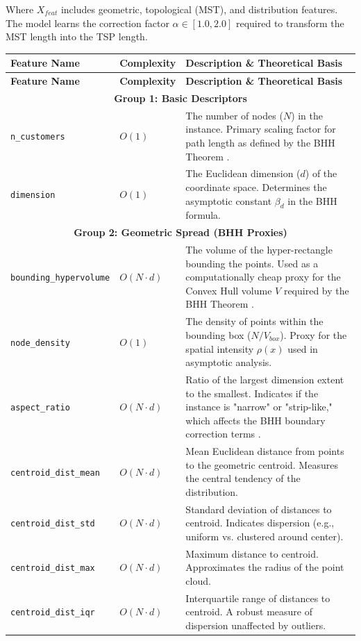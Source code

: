 \documentclass{article}
\begin{document}
\noindent Where $X_{feat}$ includes geometric, topological (MST), and distribution features. The model learns the correction factor $\alpha \in [1.0, 2.0]$ required to transform the MST length into the TSP length.
\begin{longtable}{p{4cm} p{2.5cm} p{8.5cm}}
\toprule
\textbf{Feature Name} & \textbf{Complexity} & \textbf{Description \& Theoretical Basis} \\
\midrule
\endfirsthead

\toprule
\textbf{Feature Name} & \textbf{Complexity} & \textbf{Description \& Theoretical Basis} \\
\midrule
\endhead

\multicolumn{3}{c}{\textbf{Group 1: Basic Descriptors}} \\
\midrule
\texttt{n\_customers} & $O(1)$ & The number of nodes ($N$) in the instance. Primary scaling factor for path length as defined by the BHH Theorem \cite{beardwood1959}. \\
\texttt{dimension} & $O(1)$ & The Euclidean dimension ($d$) of the coordinate space. Determines the asymptotic constant $\beta_d$ in the BHH formula. \\
\midrule

\multicolumn{3}{c}{\textbf{Group 2: Geometric Spread (BHH Proxies)}} \\
\midrule
\texttt{bounding\_hypervolume} & $O(N \cdot d)$ & The volume of the hyper-rectangle bounding the points. Used as a computationally cheap proxy for the Convex Hull volume $V$ required by the BHH Theorem \cite{beardwood1959}. \\
\texttt{node\_density} & $O(1)$ & The density of points within the bounding box ($N / V_{box}$). Proxy for the spatial intensity $\rho(x)$ used in asymptotic analysis. \\
\texttt{aspect\_ratio} & $O(N \cdot d)$ & Ratio of the largest dimension extent to the smallest. Indicates if the instance is "narrow" or "strip-like," which affects the BHH boundary correction terms \cite{percus1996}. \\
\texttt{centroid\_dist\_mean} & $O(N \cdot d)$ & Mean Euclidean distance from points to the geometric centroid. Measures the central tendency of the distribution. \\
\texttt{centroid\_dist\_std} & $O(N \cdot d)$ & Standard deviation of distances to centroid. Indicates dispersion (e.g., uniform vs. clustered around center). \\
\texttt{centroid\_dist\_max} & $O(N \cdot d)$ & Maximum distance to centroid. Approximates the radius of the point cloud. \\
\texttt{centroid\_dist\_iqr} & $O(N \cdot d)$ & Interquartile range of distances to centroid. A robust measure of dispersion unaffected by outliers. \\
\midrule


\end{longtable}
\end{document}
